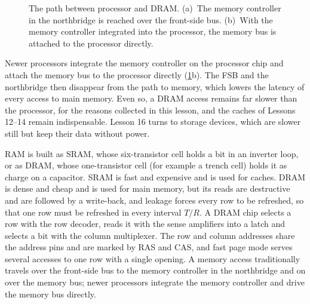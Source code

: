 \documentclass[../main.tex]{subfiles}
\begin{document}
\begin{figure}[htbp]
  \centering
  
  \caption{The path between processor and DRAM.  (a)~The memory controller in
    the northbridge is reached over the front-side bus.  (b)~With the memory
    controller integrated into the processor, the memory bus is attached to
    the processor directly.}
  \label{fig:l15-connection}
\end{figure}

Newer processors integrate the memory controller on the processor chip and
attach the memory bus to the processor directly
(\cref{fig:l15-connection}b).
The FSB and the northbridge then disappear from the path to memory, which
lowers the latency of every access to main memory.  Even so, a DRAM access
remains far slower than the processor, for the reasons collected in this
lesson, and the caches of Lessons 12--14 remain indispensable.  Lesson 16
turns to storage devices, which are slower still but keep their data without
power.

\begin{keypoint}
  RAM is built as SRAM, whose six-transistor cell holds a bit in an inverter
  loop, or as DRAM, whose one-transistor cell (for example a trench cell)
  holds it as charge on a capacitor.  SRAM is fast and expensive and is used
  for caches.  DRAM is dense and cheap and is used for main memory, but its
  reads are destructive and are followed by a write-back, and leakage forces
  every row to be refreshed, so that one row must be refreshed in every
  interval $T/R$.  A DRAM chip selects a row with the row decoder, reads it
  with the sense amplifiers into a latch and selects a bit with the column
  multiplexer.  The row and column addresses share the address pins and are
  marked by RAS and CAS, and fast page mode serves several accesses to one row
  with a single opening.  A memory access traditionally travels over the
  front-side bus to the memory controller in the northbridge and on over the
  memory bus; newer processors integrate the memory controller and drive the
  memory bus directly.
\end{keypoint}
\end{document}
